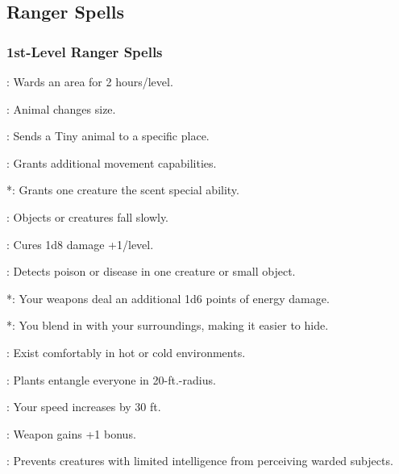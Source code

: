 \subsection{Ranger Spells}
\subsubsection{1st-Level Ranger Spells}
\begin{list}{}{\leftmargin=1em}
\item {}: Wards an area for 2 hours/level.
\item {}: Animal changes size.
\item {}: Sends a Tiny animal to a specific place.
\item {}: Grants additional movement capabilities.
\item {}*: Grants one creature the scent special ability.
\item {}: Objects or creatures fall slowly.
\item {}: Cures 1d8 damage +1/level.
\item {}: Detects poison or disease in one creature or small object.
\item {}*: Your weapons deal an additional 1d6 points of energy damage.
\item {}*: You blend in with your surroundings, making it easier to hide.
\item {}: Exist comfortably in hot or cold environments.
\item {}: Plants entangle everyone in 20-ft.-radius.
\item {}: Your speed increases by 30 ft.
\item {}: Weapon gains +1 bonus.
\item {}: Prevents creatures with limited intelligence from perceiving warded subjects.

\end{list}
